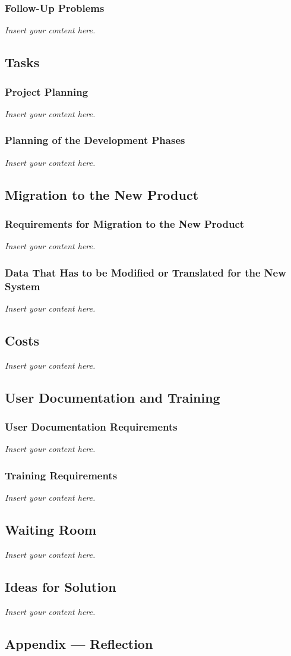 \documentclass[12pt]{article}
\newcommand{\lips}{\textit{Insert your content here.}}
\begin{document}
\subsubsection{Follow-Up Problems}
\lips

\subsection{Tasks}
\subsubsection{Project Planning}
\lips
\subsubsection{Planning of the Development Phases}
\lips

\subsection{Migration to the New Product}
\subsubsection{Requirements for Migration to the New Product}
\lips
\subsubsection{Data That Has to be Modified or Translated for the New System}
\lips

\subsection{Costs}
\lips
\subsection{User Documentation and Training}
\subsubsection{User Documentation Requirements}
\lips
\subsubsection{Training Requirements}
\lips

\subsection{Waiting Room}
\lips

\subsection{Ideas for Solution}
\lips

\newpage{}
\subsection*{Appendix --- Reflection}




\end{document}
